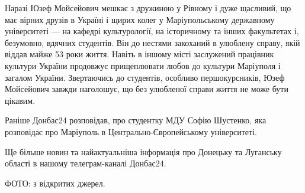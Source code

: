 Наразі Юзеф Мойсейович мешкає з дружиною у Рівному і дуже щасливий, що має
вірних друзів в Україні і щирих колег у Маріупольському державному університеті
— на кафедрі культурології, на історичному та інших факультетах і, безумовно,
вдячних студентів. Він до нестями закоханий в улюблену справу, якій віддав
майже 53 роки життя. Навіть в іншому місті заслужений працівник культури
України продовжує прищеплювати любов до культури Маріуполя і загалом України.
Звертаючись до студентів, особливо першокурсників, Юзеф Мойсейович завжди
наголошує, що без улюбленої справи життя не може бути цікавим.

Раніше Донбас24 розповідав, про студентку МДУ Софію Шустенко, яка розповідає
про Маріуполь в Центрально-Європейському університеті.

Ще більше новин та найактуальніша інформація про Донецьку та Луганську області
в нашому телеграм-каналі Донбас24.

ФОТО: з відкритих джерел.
